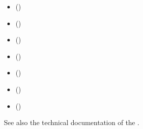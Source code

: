 \documentclass[a4paper,10pt,english]{sphinxhowto}
\begin{document}
\begin{sphinxShadowBox}
\begin{itemize}
\item {} 
\label{\detokenize{tutorial:id184}}{\hyperref[\detokenize{tutorial:outranking-digraph}]{}} ()

\item {} 
\label{\detokenize{tutorial:id185}}{\hyperref[\detokenize{tutorial:browsing-the-performances}]{}} ()

\item {} 
\label{\detokenize{tutorial:id186}}{\hyperref[\detokenize{tutorial:valuation-semantics}]{}} ()

\item {} 
\label{\detokenize{tutorial:id187}}{\hyperref[\detokenize{tutorial:pairwise-comparisons}]{}} ()

\item {} 
\label{\detokenize{tutorial:id188}}{\hyperref[\detokenize{tutorial:recoding-the-valuation}]{}} ()

\item {} 
\label{\detokenize{tutorial:id189}}{\hyperref[\detokenize{tutorial:codual-digraph}]{}} ()

\item {} 
\label{\detokenize{tutorial:id190}}{\hyperref[\detokenize{tutorial:xmcda-2-0}]{}} ()

\end{itemize}
\end{sphinxShadowBox}

See also the technical documentation of the .
\end{document}
